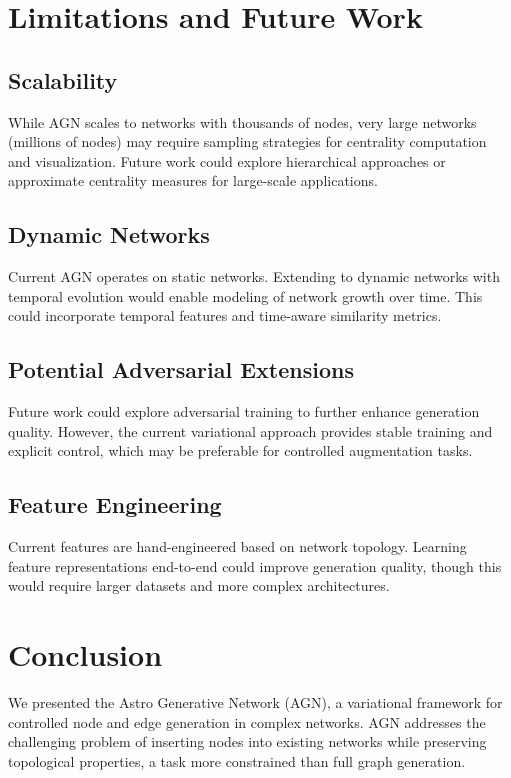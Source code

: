 \documentclass[12pt]{article}
\begin{document}
\section{Limitations and Future Work}

\subsection{Scalability}

While AGN scales to networks with thousands of nodes, very large networks (millions of nodes) may require sampling strategies for centrality computation and visualization. Future work could explore hierarchical approaches or approximate centrality measures for large-scale applications.

\subsection{Dynamic Networks}

Current AGN operates on static networks. Extending to dynamic networks with temporal evolution would enable modeling of network growth over time. This could incorporate temporal features and time-aware similarity metrics.

\subsection{Potential Adversarial Extensions}

Future work could explore adversarial training to further enhance generation quality. However, the current variational approach provides stable training and explicit control, which may be preferable for controlled augmentation tasks.

\subsection{Feature Engineering}

Current features are hand-engineered based on network topology. Learning feature representations end-to-end could improve generation quality, though this would require larger datasets and more complex architectures.

\section{Conclusion}

We presented the Astro Generative Network (AGN), a variational framework for controlled node and edge generation in complex networks. AGN addresses the challenging problem of inserting nodes into existing networks while preserving topological properties, a task more constrained than full graph generation.
\end{document}
